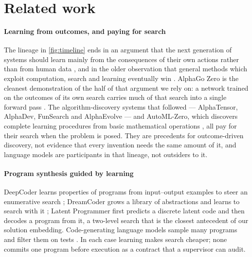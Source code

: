 \section{Related work}
\label{sec:related}

\paragraph{Learning from outcomes, and paying for search} The lineage in \cref{fig:timeline} ends in
an argument that the next generation of systems should learn mainly from the consequences of their
own actions rather than from human data \citep{silver2025era}, and in the older observation that
general methods which exploit computation, search and learning eventually win
\citep{sutton2019bitter}. AlphaGo Zero is the cleanest demonstration of the half of that argument we
rely on: a network trained on the outcomes of its own search carries much of that search into a
single forward pass \citep{silver2017zero}. The algorithm-discovery systems that followed ---
AlphaTensor, AlphaDev, FunSearch and AlphaEvolve
\citep{fawzi2022alphatensor,mankowitz2023alphadev,romeraparedes2024funsearch,novikov2025alphaevolve}
--- and AutoML-Zero, which discovers complete learning procedures from basic mathematical operations
\citep{real2020automlzero}, all pay for their search when the problem is posed. They are precedents
for outcome-driven discovery, not evidence that every invention needs the same amount of it, and
language models are participants in that lineage, not outsiders to it.

\paragraph{Program synthesis guided by learning} DeepCoder learns properties of programs from
input--output examples to steer an enumerative search \citep{balog2017deepcoder}; DreamCoder grows
a library of abstractions and learns to search with it \citep{ellis2021dreamcoder}; Latent Programmer
first predicts a discrete latent code and then decodes a program from it, a two-level search
\citep{hong2021latent} that is the closest antecedent of our solution embedding. Code-generating
language models sample many programs and filter them on tests \citep{chen2021codex,li2022alphacode}.
In each case learning makes search cheaper; none commits one program before execution as a
contract that a supervisor can audit.

